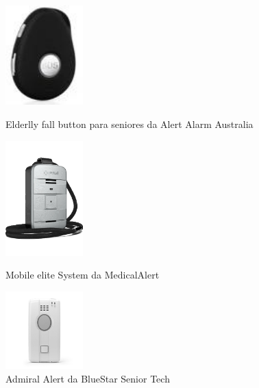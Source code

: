 \begin{figure}[!htb]
	\centering
	\begin{minipage}[b]{0.3\textwidth}\centering
		\includegraphics[width=3cm]{figuras/Sistemas_alert_Alarm_Australia.jpg}
		\caption{Elderlly fall button para seniores da Alert Alarm Australia}
		\label{fig:sistema_portable_1}
	\end{minipage}
	\hfill
	\begin{minipage}[b]{0.3\textwidth}\centering
		\includegraphics[width=3cm]{figuras/Sistemas_MedicalAlert.png}
		\caption{Mobile elite System da MedicalAlert}
		\label{fig:sistema_portable_2}
	\end{minipage}
	\hfill
	\begin{minipage}[b]{0.3\textwidth}\centering
		\includegraphics[width=3cm]{figuras/Sistemas_Bluestar.png}
		\caption{Admiral Alert da BlueStar Senior Tech}
		\label{fig:sistema_portable_3}
	\end{minipage}
\end{figure}

